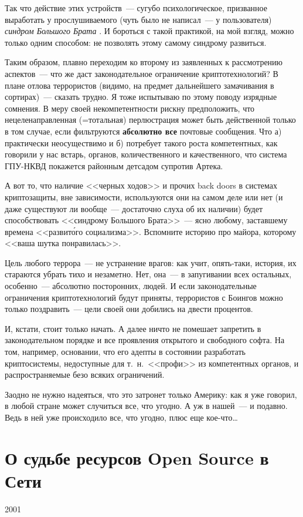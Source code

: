 Так что действие этих устройств~--- сугубо психологическое, призванное выработать у прослушиваемого (чуть было не написал~--- у пользователя) 
\textit{синдром Большого Брата}
. И бороться с такой практикой, на мой взгляд, можно только одним способом: не позволять этому самому синдрому развиться.

Таким образом, плавно переходим ко второму из заявленных к рассмотрению аспектов~--- что же даст законодательное ограничение криптотехнологий? В плане отлова террористов (видимо, на предмет дальнейшего замачивания в сортирах)~--- сказать трудно. Я тоже испытываю по этому поводу изрядные сомнения. В меру своей некомпетентности рискну предположить, что нецеленаправленная (=тотальная) перлюстрация может быть действенной только в том случае, если фильтруются \textbf{абсолютно все} почтовые сообщения. Что а) практически неосуществимо и б) потребует такого роста компетентных, как говорили у нас встарь, органов, количественного и качественного, что система ГПУ-НКВД покажется районным детсадом супротив Артека.

А вот то, что наличие <<черных ходов>> и прочих back doors в системах криптозащиты, вне зависимости, используются они на самом деле или нет (и даже существуют ли вообще~--- достаточно слуха об их наличии) будет способствовать <<синдрому Большого Брата>>~--- ясно любому, заставшему времена <<развит\'{о}го социализма>>. Вспомните историю про майора, которому <<ваша шутка понравилась>>.

Цель любого террора~--- не устранение врагов: как учит, опять-таки, история, их стараются убрать тихо и незаметно. Нет, она~--- в запугивании всех остальных, особенно~--- абсолютно посторонних, людей. И если законодательные ограничения криптотехнологий будут приняты, террористов с Боингов можно только поздравить~--- цели своей они добились на двести процентов.

И, кстати, стоит только начать. А далее ничто не помешает запретить в законодательном порядке и все проявления открытого и свободного софта. На том, например, основании, что его адепты в состоянии разработать криптосистемы, недоступные для т.~н.~<<профи>> из компетентных органов, и распространяемые безо всяких ограничений.

Заодно не нужно надеяться, что это затронет только Америку: как я уже говорил, в любой стране может случиться все, что угодно. А уж в нашей~--- и подавно. Ведь в ней уже происходило все, что угодно, плюс еще кое-что\dots

\section{О судьбе ресурсов Open Source в Сети} 
\begin{timeline}2001\end{timeline}


